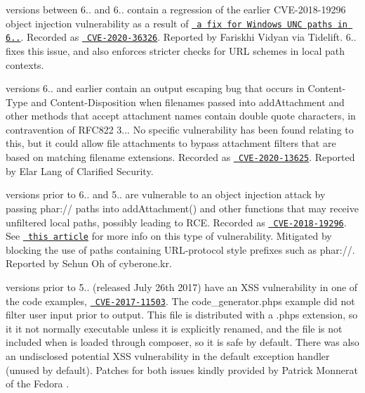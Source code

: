  versions between 6.. and 6.. contain a regression of the earlier CVE-\/2018-\/19296 object injection vulnerability as a result of \href{https://github.com/PHPMailer/PHPMailer/commit/e2e07a355ee8ff36aba21d0242c5950c56e4c6f9}{\texttt{ a fix for Windows UNC paths in 6..}}. Recorded as \href{https://web.nvd.nist.gov/view/vuln/detail?vulnId=CVE-2020-36326}{\texttt{ CVE-\/2020-\/36326}}. Reported by Fariskhi Vidyan via Tidelift. 6.. fixes this issue, and also enforces stricter checks for URL schemes in local path contexts.

 versions 6.. and earlier contain an output escaping bug that occurs in {\ttfamily Content-\/\+Type} and {\ttfamily Content-\/\+Disposition} when filenames passed into {\ttfamily add\+Attachment} and other methods that accept attachment names contain double quote characters, in contravention of RFC822 3... No specific vulnerability has been found relating to this, but it could allow file attachments to bypass attachment filters that are based on matching filename extensions. Recorded as \href{https://web.nvd.nist.gov/view/vuln/detail?vulnId=CVE-2020-13625}{\texttt{ CVE-\/2020-\/13625}}. Reported by Elar Lang of Clarified Security.

 versions prior to 6.. and 5.. are vulnerable to an object injection attack by passing {\ttfamily phar\+://} paths into {\ttfamily add\+Attachment()} and other functions that may receive unfiltered local paths, possibly leading to RCE. Recorded as \href{https://web.nvd.nist.gov/view/vuln/detail?vulnId=CVE-2018-19296}{\texttt{ CVE-\/2018-\/19296}}. See \href{https://knasmueller.net/5-answers-about-php-phar-exploitation}{\texttt{ this article}} for more info on this type of vulnerability. Mitigated by blocking the use of paths containing URL-\/protocol style prefixes such as {\ttfamily phar\+://}. Reported by Sehun Oh of cyberone.\+kr.

 versions prior to 5.. (released July 26th 2017) have an XSS vulnerability in one of the code examples, \href{https://web.nvd.nist.gov/view/vuln/detail?vulnId=CVE-2017-11503}{\texttt{ CVE-\/2017-\/11503}}. The {\ttfamily code\+\_\+generator.\+phps} example did not filter user input prior to output. This file is distributed with a {\ttfamily .phps} extension, so it it not normally executable unless it is explicitly renamed, and the file is not included when  is loaded through composer, so it is safe by default. There was also an undisclosed potential XSS vulnerability in the default exception handler (unused by default). Patches for both issues kindly provided by Patrick Monnerat of the Fedora .

